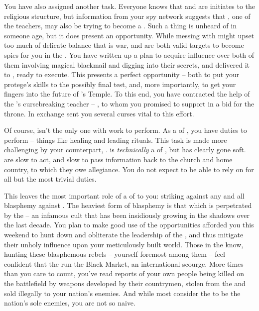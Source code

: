 \documentclass[char]{GL2020}
\begin{document}
You have also assigned \cScholarship{\them} another task. Everyone knows that \cInitiate{} and \cWarlordDaughter{} are initiates to the \pShip{} religious structure, but information from your spy network suggests that \cPirate{}, one of the teachers, may also be trying to become a \cPirate{\cleric}. Such a thing is unheard of in someone \cPirate{\their} age, but it does present an opportunity. While messing with \cWarlordDaughter{} might upset too much of delicate balance that is war, \cInitiate{} and \cPirate{} are both valid targets to become spies for you in the \pShip{}. You have written up a plan to acquire influence over both of them involving magical blackmail and digging into their secrets, and delivered it to \cScholarship{}, ready to execute. This presents a perfect opportunity -- both to put your protege’s skills to the possibly final test, and, more importantly, to get your fingers into the future of \pShip{}’s Temple. To this end, you have contracted the help of the \pSc{}’s cursebreaking teacher -- \cPrince{}, to whom you promised to support in a bid for the throne. In exchange \cPrince{\they} sent you several curses vital to this effort.

Of course, \cScholarship{} isn’t the only one with work to perform. As a \cAntiChup{\cleric} of \cTechGod{}, you have duties to perform -- things like healing and leading rituals. This task is made more challenging by your counterpart, \cBeetle{}. \cBeetle{} is \emph{technically} a \cBeetle{\cleric} of \cTechGod{}, but has clearly gone soft. \cBeetle{\They} are slow to act, and slow to pass information back to the church and \cBeetle{\their} home country, to which they owe allegiance. You do not expect to be able to rely on \cBeetle{} for all but the most trivial duties.

This leaves the most important role of a \cAntiChup{\cleric} of \cTechGod{} to you: striking against any and all blasphemy against \cTechGod{}. The heaviest form of blasphemy is that which is perpetrated by the \pGoaties{} -- an infamous cult that has been insidiously growing in the shadows over the last decade. You plan to make good use of the opportunities afforded you this weekend to hunt down and obliterate the leadership of the \pGoaties{}, and thus mitigate their unholy influence upon your meticulously built world. Those in the know, hunting these blasphemous rebels -- yourself foremost among them -- feel confident that the \pGoaties{} run the Black Market, an international scourge. More times than you care to count, you’ve read reports of your own people being killed on the battlefield by weapons developed by their countrymen, stolen from the \pTech{} and sold illegally to your nation’s enemies. And while most consider the \pShippies{} to be the nation’s sole enemies, you are not so naive. 
\end{document}
